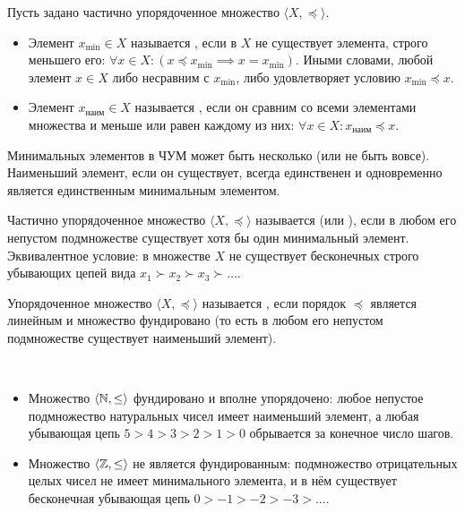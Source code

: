 \begin{definition}
    Пусть задано частично упорядоченное множество $\langle X, \preceq \rangle$.
    \begin{itemize}
        \item Элемент $x_{\min} \in X$ называется , 
        если в $X$ не существует элемента, строго меньшего его: 
        $\forall x \in X : (x \preceq x_{\min} \implies x = x_{\min})$. 
        Иными словами, любой элемент $x \in X$ либо несравним с $x_{\min}$, 
        либо удовлетворяет условию $x_{\min} \preceq x$.
        \item Элемент $x_{\text{наим}} \in X$ называется 
        , если он сравним со всеми элементами множества 
        и меньше или равен каждому из них: 
        $\forall x \in X : x_{\text{наим}} \preceq x$.
    \end{itemize}
    Минимальных элементов в ЧУМ может быть несколько (или не быть вовсе). 
    Наименьший элемент, если он существует, всегда единственен и 
    одновременно является единственным минимальным элементом.
\end{definition}

\begin{definition}
    Частично упорядоченное множество $\langle X, \preceq \rangle$ называется 
     (или ), если в любом 
    его непустом подмножестве существует хотя бы один минимальный элемент.
    Эквивалентное условие: в множестве $X$ не существует бесконечных 
    строго убывающих цепей вида $x_1 \succ x_2 \succ x_3 \succ \dots$.
\end{definition}

\begin{definition}
    Упорядоченное множество $\langle X, \preceq \rangle$ называется 
    , если порядок $\preceq$ является 
    линейным и множество фундировано (то есть в любом его непустом 
    подмножестве существует наименьший элемент).
\end{definition}

\begin{example} ~
    \begin{itemize}
        \item Множество $\langle \mathbb{N}, \le \rangle$ фундировано и вполне 
        упорядочено: любое непустое подмножество натуральных чисел имеет 
        наименьший элемент, а любая убывающая цепь $5 > 4 > 3 > 2 > 1 > 0$ 
        обрывается за конечное число шагов.
        \item Множество $\langle \mathbb{Z}, \le \rangle$ не является фундированным: 
        подмножество отрицательных целых чисел не имеет минимального 
        элемента, и в нём существует бесконечная убывающая цепь 
        $0 > -1 > -2 > -3 > \dots$.
    \end{itemize}
\end{example}

